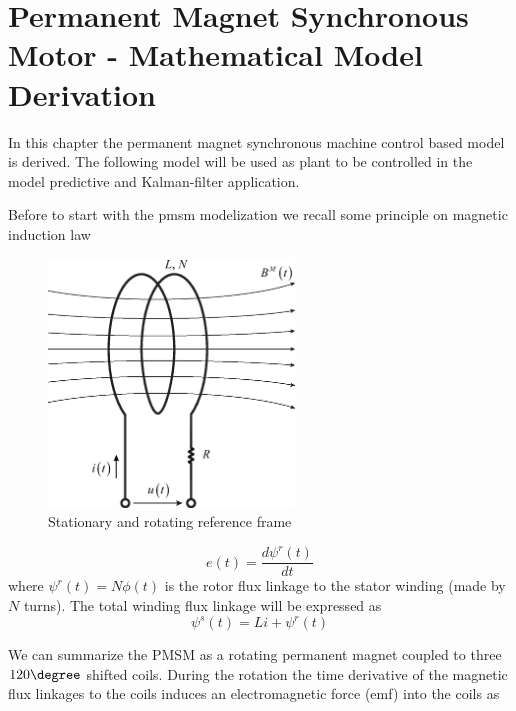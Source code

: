 \documentclass[11pt,a4paper,oneside]{book}
\numberwithin{equation}{section}
\theoremstyle{it}
\theoremstyle{definition}
\begin{document}
\section{Permanent Magnet Synchronous Motor - Mathematical Model Derivation}
In this chapter the permanent magnet synchronous machine control based model is 
derived. The following model will be used as plant to be controlled in the 
model predictive and Kalman-filter application.

Before to start with the pmsm modelization we recall some principle on magnetic 
induction law 
\begin{figure}[H]
	\centering
	\includegraphics[width = 185pt, 
	keepaspectratio]{figures/pmsm/coil_induction.eps}
	\captionsetup{width=0.5\textwidth, font=small} 
	\caption	{Stationary and rotating reference frame}
	\label{coil_induction}
\end{figure}
\begin{equation}
	e(t) = \frac{d\psi^r(t)}{dt}
\end{equation}
where $\psi^r(t) = N\phi(t)$ is the rotor flux linkage to the stator winding 
(made by $N$ turns). The total winding flux linkage will be expressed as
\begin{equation}
	\psi^s(t) = Li+\psi^r(t)
\end{equation}

We can summarize the PMSM as a rotating permanent magnet coupled to three 
$120\degree$ shifted coils. During the rotation the time derivative of the 
magnetic flux linkages to the coils induces an electromagnetic force (emf) into 
the coils as
\end{document}
